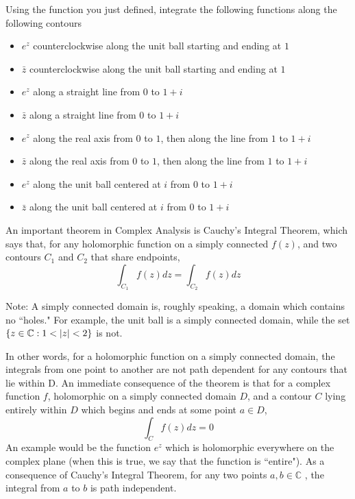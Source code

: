 \begin{problem}
Using the function you just defined, integrate the following functions along the following contours
\begin{itemize}
\item $e^z$ counterclockwise along the unit ball starting and ending at $1$
\item $\bar{z}$ counterclockwise along the unit ball starting and ending at $1$
\item $e^z$ along a straight line from $0$ to $1+i$
\item $\bar{z}$ along a straight line from $0$ to $1+i$
\item $e^z$ along the real axis from $0$ to $1$, then along the line from $1$ to $1+i$
\item $\bar{z}$ along the real axis from $0$ to $1$, then along the line from $1$ to $1+i$
\item $e^z$ along the unit ball centered at $i$ from $0$ to $1+i$
\item $\bar{z}$ along the unit ball centered at $i$ from $0$ to $1+i$
\end{itemize}
\end{problem}

An important theorem in Complex Analysis is Cauchy's Integral Theorem, which says that, for any holomorphic function on a simply connected  $f(z)$, and two contours $C_1$ and $C_2$ that share endpoints, $$\int_{C_1}f(z)dz = \int_{C_2}f(z)dz$$

Note: A simply connected domain is, roughly speaking, a domain which contains no ``holes." For example, the unit ball is a simply connected domain, while the set $\lbrace z\in \mathbb{C}:1<\left\lvert z\right\rvert<2\rbrace$ is not. 

In other words, for a holomorphic function on a simply connected domain, the integrals from one point to another are not path dependent for any contours that lie within D.
An immediate consequence of the theorem is that for a complex function $f$, holomorphic on a simply connected domain $D$, and a contour $C$ lying entirely within $D$ which begins and ends at some point $a\in D$,
$$\int_C f(z)dz=0$$
An example would be the function $e^z$ which is holomorphic everywhere on the complex plane (when this is true, we say that the function is ``entire").
As a consequence of Cauchy's Integral Theorem, for any two points $a,b\in \mathbb{C}$ , the integral from $a$ to $b$ is path independent.

